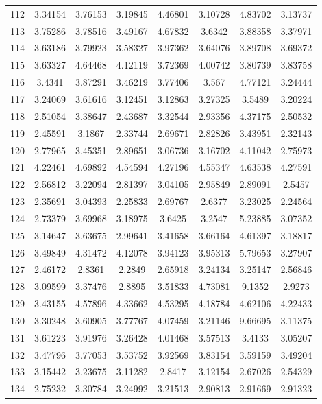 \begin{center}
\begin{longtable}{cccccccc}
112 & 3.34154 & 3.76153 & 3.19845 & 4.46801 & 3.10728 & 4.83702 & 3.13737\\
113 & 3.75286 & 3.78516 & 3.49167 & 4.67832 & 3.6342 & 3.88358 & 3.37971\\
114 & 3.63186 & 3.79923 & 3.58327 & 3.97362 & 3.64076 & 3.89708 & 3.69372\\
115 & 3.63327 & 4.64468 & 4.12119 & 3.72369 & 4.00742 & 3.80739 & 3.83758\\
116 & 3.4341 & 3.87291 & 3.46219 & 3.77406 & 3.567 & 4.77121 & 3.24444\\
117 & 3.24069 & 3.61616 & 3.12451 & 3.12863 & 3.27325 & 3.5489 & 3.20224\\
118 & 2.51054 & 3.38647 & 2.43687 & 3.32544 & 2.93356 & 4.37175 & 2.50532\\
119 & 2.45591 & 3.1867 & 2.33744 & 2.69671 & 2.82826 & 3.43951 & 2.32143\\
120 & 2.77965 & 3.45351 & 2.89651 & 3.06736 & 3.16702 & 4.11042 & 2.75973\\
121 & 4.22461 & 4.69892 & 4.54594 & 4.27196 & 4.55347 & 4.63538 & 4.27591\\
122 & 2.56812 & 3.22094 & 2.81397 & 3.04105 & 2.95849 & 2.89091 & 2.5457\\
123 & 2.35691 & 3.04393 & 2.25833 & 2.69767 & 2.6377 & 3.23025 & 2.24564\\
124 & 2.73379 & 3.69968 & 3.18975 & 3.6425 & 3.2547 & 5.23885 & 3.07352\\
125 & 3.14647 & 3.63675 & 2.99641 & 3.41658 & 3.66164 & 4.61397 & 3.18817\\
126 & 3.49849 & 4.31472 & 4.12078 & 3.94123 & 3.95313 & 5.79653 & 3.27907\\
127 & 2.46172 & 2.8361 & 2.2849 & 2.65918 & 3.24134 & 3.25147 & 2.56846\\
128 & 3.09599 & 3.37476 & 2.8895 & 3.51833 & 4.73081 & 9.1352 & 2.9273\\
129 & 3.43155 & 4.57896 & 4.33662 & 4.53295 & 4.18784 & 4.62106 & 4.22433\\
130 & 3.30248 & 3.60905 & 3.77767 & 4.07459 & 3.21146 & 9.66695 & 3.11375\\
131 & 3.61223 & 3.91976 & 3.26428 & 4.01468 & 3.57513 & 3.4133 & 3.05207\\
132 & 3.47796 & 3.77053 & 3.53752 & 3.92569 & 3.83154 & 3.59159 & 3.49204\\
133 & 3.15442 & 3.23675 & 3.11282 & 2.8417 & 3.12154 & 2.67026 & 2.54329\\
134 & 2.75232 & 3.30784 & 3.24992 & 3.21513 & 2.90813 & 2.91669 & 2.91323\\

\end{longtable}
\end{center}
